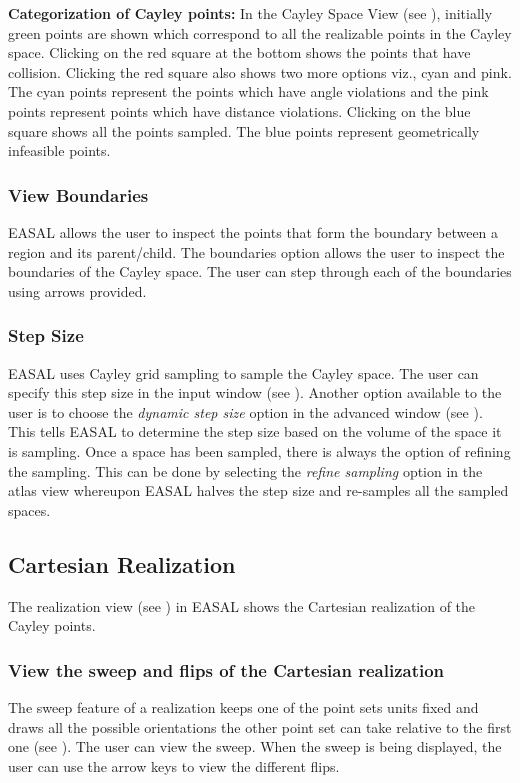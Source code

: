 \documentclass[10pt]{article}
\begin{document}
\noindent\textbf{Categorization of Cayley points:} In the Cayley Space View
(see ), initially green points are shown which
correspond to all the realizable points in the Cayley space. Clicking on the
red square at the bottom shows the points that have collision.  Clicking
the red square also shows two more options viz., cyan and pink. The cyan points
represent the points which have angle violations and the pink points represent
points which have distance violations. Clicking on the blue square shows all the
points sampled. The blue points represent geometrically infeasible points.

\subsubsection{View Boundaries}
EASAL allows the user to inspect the points that form the boundary between a
region and its parent/child. The boundaries option allows the user to inspect
the boundaries of the Cayley space. The user can step through each of the
boundaries using arrows provided.

\subsubsection{Step Size}
EASAL uses Cayley grid sampling to sample the Cayley space. The user can
specify this step size in the input window (see ). Another
option available to the user is to choose the \emph{dynamic step size} option in the
advanced window (see ). This tells EASAL to determine 
the step size based on the volume of the space it is sampling. Once a space has
been sampled, there is always the option of refining the sampling. This can be
done by selecting the \emph{refine sampling} option in the atlas view whereupon
EASAL halves the step size and re-samples all the sampled spaces.

\subsection{Cartesian Realization}
The realization view (see ) in EASAL shows the
Cartesian realization of the Cayley points. 

\subsubsection{View the sweep and flips of the Cartesian realization}
The sweep feature of a realization keeps one of the point sets units fixed and
draws all the possible orientations the other point set can take relative to the
first one (see ). The user can view the sweep. 
When the sweep is being displayed, the user can use
the arrow keys to view the different flips.
\end{document}
